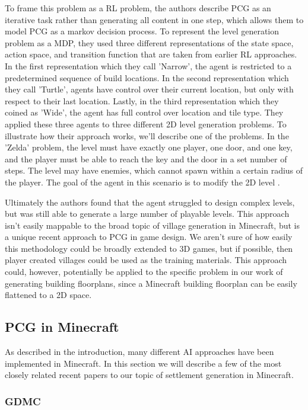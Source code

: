 \documentclass[11pt, oneside]{article}
\begin{document}
\begin{normalsize}
To frame this problem as a RL problem, the authors describe PCG as an iterative task rather than generating all content in one step, which allows them to model PCG as a markov decision process. To represent the level generation problem as a MDP, they used three different representations of the state space, action space, and transition function that are taken from earlier RL approaches. In the first representation which they call 'Narrow', the agent is restricted to a predetermined sequence of build locations. In the second representation which they call 'Turtle', agents have control over their current location, but only with respect to their last location. Lastly, in the third representation which they coined as 'Wide', the agent has full control over location and tile type. They applied these three agents to three different 2D level generation problems. To illustrate how their approach works, we'll describe one of the problems. In the 'Zelda' problem, the level must have exactly one player, one door, and one key, and the player must be able to reach the key and the door in a set number of steps. The level may have enemies, which cannot spawn within a certain radius of the player. The goal of the agent in this scenario is to modify the 2D level \cite{khalifa2020pcgrl}.

Ultimately the authors found that the agent struggled to design complex levels, but was still able to generate a large number of playable levels. This approach isn't easily mappable to the broad topic of village generation in Minecraft, but is a unique recent approach to PCG in game design. We aren't sure of how easily this methodology could be broadly extended to 3D games, but if possible, then player created villages could be used as the training materials. This approach could, however, potentially be applied to the specific problem in our work of generating building floorplans, since a Minecraft building floorplan can be easily flattened to a 2D space.


\subsection{PCG in Minecraft}

As described in the introduction, many different AI approaches have been implemented in Minecraft. In this section we will describe a few of the most closely related recent papers to our topic of settlement generation in Minecraft.

\subsubsection{GDMC}


\end{normalsize}
\end{document}
